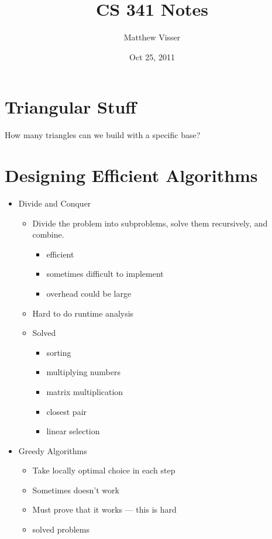 \documentclass[12pt]{article}
\begin{document}
\title{CS 341 Notes}
\author{Matthew Visser}
\date{Oct 25, 2011}
\maketitle

\section{Triangular Stuff}

How many triangles can we build with a specific base?


\section{Designing Efficient Algorithms}

\begin{itemize}
	\item Divide and Conquer
		\begin{itemize}
			\item Divide the problem into subproblems, solve them recursively,
				and combine.
				\begin{itemize}
					\item efficient
					\item sometimes difficult to implement
					\item overhead could be large
				\end{itemize}
			\item Hard to do runtime analysis
			\item Solved
				\begin{itemize}
					\item sorting
					\item multiplying numbers
					\item matrix multiplication
					\item closest pair
					\item linear selection
				\end{itemize}
		\end{itemize}
	\item Greedy Algorithms
		\begin{itemize}
			\item Take locally optimal choice in each step
			\item Sometimes doesn't work
			\item Must prove that it works --- this is hard
			\item solved problems
				\begin{itemize}

\end{itemize}
\end{itemize}
\end{itemize}
\end{document}
